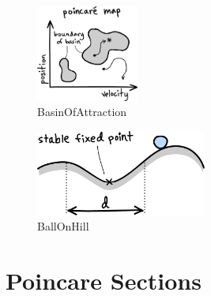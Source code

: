 \begin{figure}[h]		%
\begin{centering}
\includegraphics[width=0.3\textwidth]{Figures/BasinOfAttraction}\par
\end{centering}
\caption{BasinOfAttraction}
\label{fig:BasinOfAttraction}
\end{figure}
%

\begin{figure}[h]		%
\begin{centering}
\includegraphics[width=0.5\textwidth]{Figures/BallOnHill}\par
\end{centering}
\caption{BallOnHill}
\label{fig:BallOnHill}
\end{figure}
%

\section{Poincare Sections}
